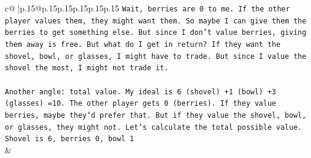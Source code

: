 \documentclass{article}
\begin{document}
{\begin{supertabular}{c@{$\;$}|p{.15\linewidth}@{}p{.15\linewidth}p{.15\linewidth}p{.15\linewidth}p{.15\linewidth}p{.15\linewidth}}
{{{\texttt{Wait, berries are 0 to me. If the other player values them, they might want them. So maybe I can give them the berries to get something else. But since I don't value berries, giving them away is free. But what do I get in return? If they want the shovel, bowl, or glasses, I might have to trade. But since I value the shovel the most, I might not trade it.} \\
\\ 
\texttt{Another angle: total value. My ideal is 6 (shovel) +1 (bowl) +3 (glasses) =10. The other player gets 0 (berries). If they value berries, maybe they'd prefer that. But if they value the shovel, bowl, or glasses, they might not. Let's calculate the total possible value. Shovel is 6, berries 0, bowl 1} \\
            }
        }
    }
    & \\ \\


\end{supertabular}}
\end{document}
